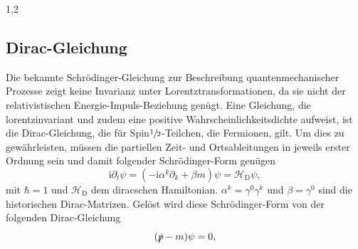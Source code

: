 \documentclass[11pt,a4paper,twoside]{report}
\begin{document}
\begin{spacing}{1,2}
\subsection{Dirac-Gleichung}
Die bekannte Schrödinger-Gleichung zur Beschreibung quantenmechanischer Prozesse zeigt keine Invarianz unter Lorentztransformationen, da sie nicht der 
relativistischen Energie-Impuls-Beziehung genügt. Eine Gleichung, die lorentzinvariant und zudem eine positive Wahrscheinlichkeitsdichte aufweist, ist
die Dirac-Gleichung, die für Spin$\sfrac12$-Teilchen, die Fermionen, gilt. Um dies zu gewährleisten, müssen die partiellen Zeit- und Ortsableitungen in 
jeweils erster Ordnung sein und damit folgender Schrödinger-Form genügen \cite{RelQuantMech}
% 
\begin{equation}
 \text{i} \partial_t \psi = \left(-\text{i}\alpha^k\partial_k + \beta m\right)\psi = \mathcal{H}_\text{D} \psi,
 \label{eq_diracSchroedinger}
\end{equation}
mit $\hbar = 1$ und $\mathcal{H}_\text{D}$ dem diracschen Hamiltonian. $\alpha^k = \gamma^0\gamma^k$ und $\beta = \gamma^0$ sind die historischen Dirac-Matrizen. Gelöst wird
diese Schrödinger-Form von der folgenden Dirac-Gleichung
\begin{equation}
 (\slashed{p} - m )\psi = 0,
 \label{eq_dirac}
\end{equation}

\end{spacing}
\end{document}
